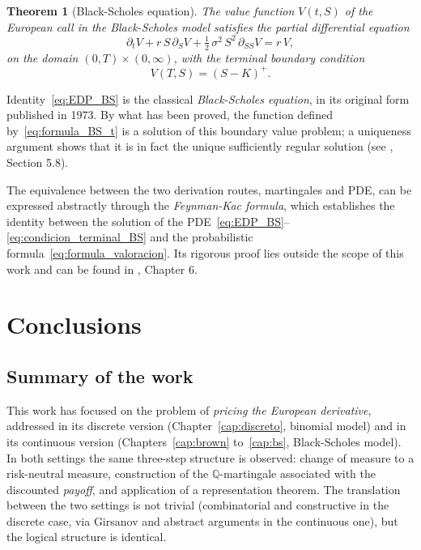 \documentclass[11pt,a4paper,oneside]{report}
\theoremstyle{plain}
\newtheorem{teorema}{Theorem}[chapter]
\theoremstyle{definition}
\theoremstyle{remark}
\newcommand{\Q}{\mathbb{Q}}
\newcommand{\1}{\mathbf{1}}
\begin{document}
\begin{teorema}[Black-Scholes equation]
\label{teo:edp_BS}
The value function $V(t, S)$ of the European \emph{call} in the
Black-Scholes model satisfies the partial differential equation
\begin{equation}\label{eq:EDP_BS}
  \boxed{\;
    \partial_t V + r\, S\, \partial_S V
    + \tfrac{1}{2}\, \sigma^2\, S^2\, \partial_{SS} V = r\, V,
  \;}
\end{equation}
on the domain $(0, T) \times (0, \infty)$, with the terminal
boundary condition
\begin{equation}\label{eq:condicion_terminal_BS}
  V(T, S) = (S - K)^+.
\end{equation}
\end{teorema}

Identity~\eqref{eq:EDP_BS} is the classical \emph{Black-Scholes
equation}, in its original form published in 1973. By what has been
proved, the function defined by~\eqref{eq:formula_BS_t} is a solution
of this boundary value problem; a uniqueness argument shows that it
is in fact the unique sufficiently regular solution (see
\cite{karatzas-shreve}, Section 5.8).

The equivalence
between the two derivation routes, martingales and PDE, can be
expressed abstractly through the \emph{Feynman-Kac formula}, which
establishes the identity between the solution of the
PDE~\eqref{eq:EDP_BS}–\eqref{eq:condicion_terminal_BS} and the
probabilistic formula~\eqref{eq:formula_valoracion}. Its rigorous
proof lies outside the scope of this work and can be found in
\cite{shreve}, Chapter 6.

\chapter{Conclusions}\label{cap:conclusiones}
\section{Summary of the work}
\label{sec:recapitulacion}

This work has focused on the problem of \emph{pricing the European
derivative}, addressed in its discrete version
(Chapter~\ref{cap:discreto}, binomial model) and in its continuous
version (Chapters~\ref{cap:brown} to~\ref{cap:bs}, Black-Scholes
model). In both settings the same three-step structure is observed:
change of measure to a risk-neutral measure, construction of the
$\Q$-martingale associated with the discounted \emph{payoff}, and
application of a representation theorem. The translation between the
two settings is not trivial (combinatorial and constructive in the
discrete case, via Girsanov and abstract arguments in the continuous
one), but the logical structure is identical.
\end{document}
